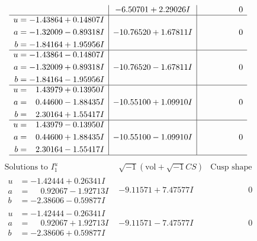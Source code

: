 \documentclass[1p]{elsarticle_modified}
\theoremstyle{definition}
\newcommand{\I}{\sqrt{-1}}
\begin{document}
$$\begin{array}{c|c|c}
 & -6.50701 + 2.29026 I & \phantom{-0.000000 } 0 \\ \hline\begin{aligned}
u &= -1.43864 + 0.14807 I \\
a &= -1.32009 - 0.89318 I \\
b &= -1.84164 + 1.95956 I\end{aligned}
 & -10.76520 + 1.67811 I & \phantom{-0.000000 } 0 \\ \hline\begin{aligned}
u &= -1.43864 - 0.14807 I \\
a &= -1.32009 + 0.89318 I \\
b &= -1.84164 - 1.95956 I\end{aligned}
 & -10.76520 - 1.67811 I & \phantom{-0.000000 } 0 \\ \hline\begin{aligned}
u &= \phantom{-}1.43979 + 0.13950 I \\
a &= \phantom{-}0.44600 - 1.88435 I \\
b &= \phantom{-}2.30164 + 1.55417 I\end{aligned}
 & -10.55100 + 1.09910 I & \phantom{-0.000000 } 0 \\ \hline\begin{aligned}
u &= \phantom{-}1.43979 - 0.13950 I \\
a &= \phantom{-}0.44600 + 1.88435 I \\
b &= \phantom{-}2.30164 - 1.55417 I\end{aligned}
 & -10.55100 - 1.09910 I & \phantom{-0.000000 } 0\\
 \hline 
 \end{array}$$\newpage$$\begin{array}{c|c|c}  
\text{Solutions to }I^u_{1}& \I (\text{vol} + \sqrt{-1}CS) & \text{Cusp shape}\\
 \hline 
\begin{aligned}
u &= -1.42444 + 0.26341 I \\
a &= \phantom{-}0.92067 - 1.92713 I \\
b &= -2.38606 - 0.59877 I\end{aligned}
 & -9.11571 + 7.47577 I & \phantom{-0.000000 } 0 \\ \hline\begin{aligned}
u &= -1.42444 - 0.26341 I \\
a &= \phantom{-}0.92067 + 1.92713 I \\
b &= -2.38606 + 0.59877 I\end{aligned}
 & -9.11571 - 7.47577 I & \phantom{-0.000000 } 0 \\ \hline\begin{aligned}

\end{aligned}
\end{array}$$
\end{document}
